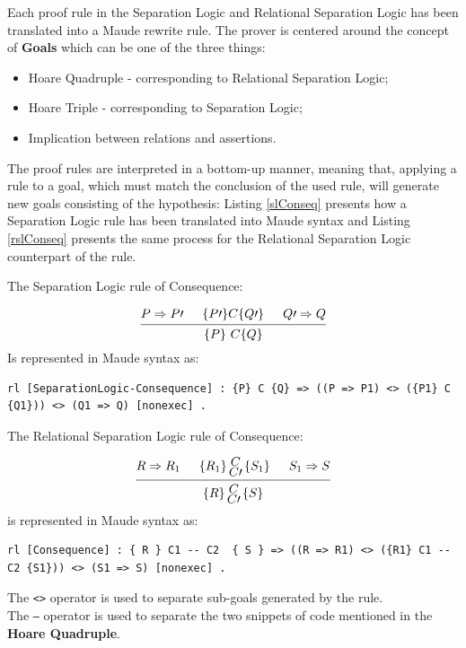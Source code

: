 \documentclass[12pt,a4paper]{article}
\newcommand{\hq}[4]{
	\left\{{#1}\right\}
	\let\scriptstyle\textstyle 
	\substack{{#2} \\ 	\let\scriptstyle\textstyle {#3}} 
	\left\{{#4}\right\}
}
\begin{document}
Each proof rule in the Separation Logic and Relational Separation Logic has been translated into a Maude rewrite rule. The prover is centered around the concept of \textbf{Goals} which can be one of the three things: 
\begin{itemize}
	\item {Hoare Quadruple} - corresponding to Relational Separation Logic;
	\item {Hoare Triple} - corresponding to Separation Logic;
	\item {Implication between relations and assertions}.
\end{itemize} 
The proof rules are interpreted in a bottom-up manner, meaning that, applying a rule to a goal, which must match the conclusion of the used rule, will generate new goals consisting of the hypothesis: Listing \ref{slConseq} presents how a Separation Logic rule has been translated into Maude syntax and Listing \ref{rslConseq} presents the same process for the Relational Separation Logic counterpart of the rule.
\begin{flushleft}
	The Separation Logic rule of \textsf{Consequence}:
\end{flushleft}
	\medskip
	\[
	\begin{prooftree}
	\Hypo{P \Rightarrow P\prime}
	\Hypo{\{P\prime\} C \{Q\prime\}}
	\Hypo{Q\prime \Rightarrow Q}
	\Infer 3 {\{P\}\  C  \{Q\}}
	\end{prooftree}	
	\]
	Is represented in Maude syntax as: 
\begin{lstlisting}[caption=Separation Logic Consequence rule,label=slConseq]
	rl [SeparationLogic-Consequence] : {P} C {Q} => ((P => P1) <> ({P1} C {Q1})) <> (Q1 => Q) [nonexec] .
\end{lstlisting}
\begin{flushleft}
	The Relational Separation Logic rule of \textsf{Consequence}:
\end{flushleft}
	\[
	\begin{prooftree}
	\Hypo{R \Rightarrow R_1}
	\Hypo{\hq{R_1}{C}{C\prime}{S_1}}
	\Hypo{S_1 \Rightarrow S}
	\Infer 3 {\hq{R}{C}{C\prime}{S}}
	\end{prooftree}	
	\]
	is represented in Maude syntax as: 
	\begin{lstlisting}[caption=Relational Separation Logic Consequence rule,label=rslConseq]
	rl [Consequence] : { R } C1 -- C2  { S } => ((R => R1) <> ({R1} C1 -- C2 {S1})) <> (S1 => S) [nonexec] .
	\end{lstlisting}
The \texttt{<>} operator is used to separate sub-goals generated by the rule.
\\
The \texttt{---} operator is used to separate the two snippets of code mentioned in the \textbf{Hoare Quadruple}.
\\
\end{document}

